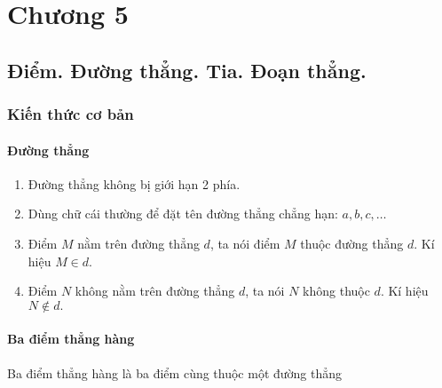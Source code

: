 \def\i{\item}
\chapter{Chương 5}
\section{Điểm. Đường thẳng. Tia. Đoạn thẳng.}
\subsection{Kiến thức cơ bản}
\subsubsection{Đường thẳng}
\begin{enumerate}[--,leftmargin=*]
	\i Đường thẳng không bị giới hạn 2 phía.
	\i Dùng chữ cái thường để đặt tên đường thẳng chẳng hạn: $a,b,c,\ldots$
%		
\i Điểm $M$ nằm trên đường thẳng $d$, ta nói điểm $M$ thuộc đường thẳng $d$. Kí hiệu $M\in d.$
%		
\i Điểm $N$ không nằm trên đường thẳng $d$, ta nói $N$ không thuộc $d$. Kí hiệu $N\notin d.$
\end{enumerate}
\subsubsection{Ba điểm thẳng hàng}
Ba điểm thẳng hàng là ba điểm cùng thuộc một đường thẳng 
%		
